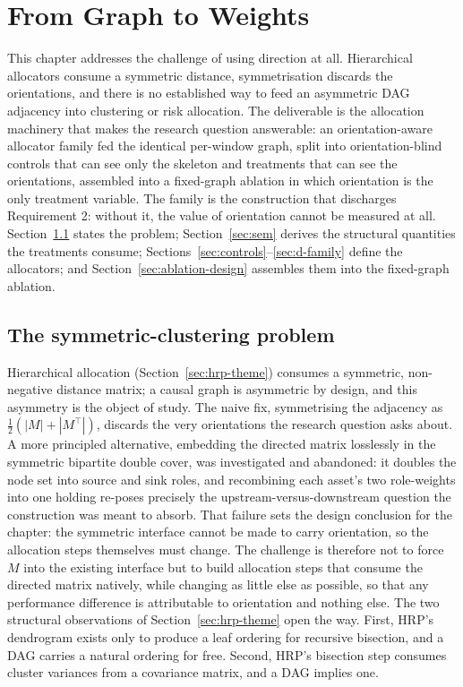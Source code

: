 \chapter{From Graph to Weights}
\label{chap:sensitivity}

This chapter addresses the challenge of using direction at all. Hierarchical
allocators consume a symmetric distance, symmetrisation discards the
orientations, and there is no established way to feed an asymmetric DAG
adjacency into clustering or risk allocation. The deliverable is the
allocation machinery that makes the research question answerable: an
orientation-aware allocator family fed the identical per-window graph, split
into orientation-blind controls that can see only the skeleton and treatments
that can see the orientations, assembled into a fixed-graph ablation in which
orientation is the only treatment variable. The family is the construction that
discharges
Requirement 2: without it, the value of orientation cannot be measured at
all. Section~\ref{sec:symm} states the problem;
Section~\ref{sec:sem} derives the structural quantities the treatments
consume; Sections~\ref{sec:controls}--\ref{sec:d-family} define the
allocators; and Section~\ref{sec:ablation-design} assembles them into the
fixed-graph ablation.

\section{The symmetric-clustering problem}
\label{sec:symm}

Hierarchical allocation (Section~\ref{sec:hrp-theme}) consumes a symmetric,
non-negative distance matrix; a causal graph is asymmetric by design, and
this asymmetry is the object of study. The naive fix, symmetrising the
adjacency as
$\tfrac{1}{2}(|M| + |M^\top|)$, discards the very orientations the research
question asks
about. A more principled alternative, embedding the directed matrix
losslessly in the symmetric bipartite double cover, was investigated
and abandoned: it doubles the node set into source and sink roles, and
recombining each asset's two role-weights into one holding re-poses
precisely the upstream-versus-downstream question the construction was
meant to absorb. That failure sets the design conclusion for the
chapter: the
symmetric interface cannot be made to carry orientation, so the
allocation steps themselves must change. The challenge is therefore not to
force $M$ into the existing
interface but to build allocation steps that consume the directed
matrix natively, while changing as little else as possible, so that any
performance difference is attributable to orientation and nothing else. The
two structural observations of Section~\ref{sec:hrp-theme} open the way.
First, HRP's dendrogram exists only to produce a leaf ordering for
recursive bisection, and a DAG carries a natural ordering for free.
Second, HRP's bisection step consumes cluster variances from a
covariance matrix, and a DAG implies one.

